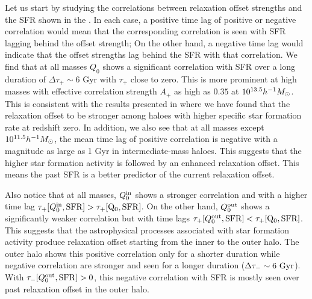Let us start by studying the correlations between relaxation offset strengths and the SFR shown in the . In each case, a positive time lag of positive or negative correlation would mean that the corresponding correlation is seen with SFR lagging behind the offset strength; On the other hand, a negative time lag would indicate that the offset strengths lag behind the SFR with that correlation. We find that at all masses $Q_0$ shows a significant correlation with SFR over a long duration of $\Delta \tau_{+}\sim 6$ Gyr with $\tau_{+}$ close to zero. This is more prominent at high masses with effective correlation strength $A_{+}$ as high as $0.35$ at $10^{13.5} h^{-1}M_{\odot}$. This is consistent with the results presented in  where we have found that the relaxation offset to be stronger among haloes with higher specific star formation rate at redshift zero. In addition, we also see that at all masses except $10^{11.5}h^{-1}M_{\odot}$, the mean time lag of positive correlation is negative with a magnitude as large as 1 Gyr in intermediate-mass haloes. This suggests that the higher star formation activity is followed by an enhanced relaxation offset. This means the past SFR is a better predictor of the current relaxation offset.

Also notice that at all masses, $Q_0^{\rm{in}}$ shows a stronger correlation and with a higher time lag $\tau_{+}[Q_0^{\rm{in}},\rm{SFR}] > \tau_{+}[Q_0,\rm{SFR}]$. On the other hand, $Q_0^{\rm{out}}$ shows a significantly weaker correlation but with time lags $\tau_{+}[Q_0^{\rm{out}},\rm{SFR}] < \tau_{+}[Q_0,\rm{SFR}]$. This suggests that the astrophysical processes associated with star formation activity produce relaxation offset starting from the inner to the outer halo. The outer halo shows this positive correlation only for a shorter duration while negative correlation are stronger and seen for a longer duration ($\Delta \tau_{-}\sim 6 ~\rm{Gyr}$). With $\tau_{-}[Q_0^{\rm{out}},\rm{SFR}]>0$, this negative correlation with SFR is mostly seen over past relaxation offset in the outer halo.


